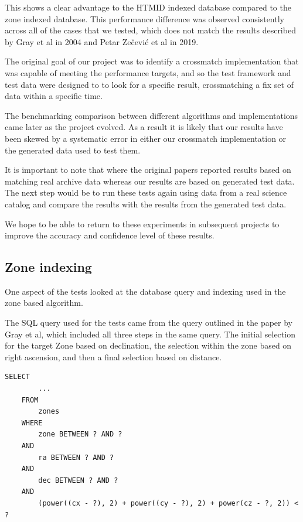 \documentclass{article}
\newcommand{\htmid} {HTMID\xspace}
\newcommand{\crossmatch} {crossmatch\xspace}
\newcommand{\crossmatching} {crossmatching\xspace}
\newcommand{\benchmarking} {benchmarking\xspace}
\begin{document}
This shows a clear advantage to the \htmid indexed database compared to the zone indexed database.
This performance difference was observed consistently across all of the cases that we tested, which does not match the results described by Gray et al in 2004\cite{Gray-2004} and Petar Zečević et al in 2019\cite{Zecevic-2019}.

The original goal of our project was to identify a \crossmatch
implementation that was capable of meeting the performance targets, and so the test framework and test data were designed to to look for a specific result, \crossmatching a fix set of data within a specific time.

The \benchmarking comparison between different algorithms and implementations came later as the project evolved. As a result it is likely that our results have been skewed by a systematic error in either our \crossmatch implementation or the generated data used to test them.

It is important to note that where the original papers reported results based on matching real archive data whereas our results are based on generated test data.
The next step would be to run these tests again using data from a real science catalog and compare the results with the results from the generated test data.

We hope to be able to return to these experiments in subsequent projects to improve the accuracy and confidence level of these results.

\subsection{Zone indexing}
\label{zone-indexing}

One aspect of the tests looked at the database query and indexing used in the zone based algorithm.

The SQL query used for the tests came from the query outlined in the paper by Gray et al, which included all three steps in the same query. The initial selection for the target Zone based on declination, the selection within the zone based on right ascension, and then a final selection based on distance.

\begin{lstlisting}[style=SQL]
    SELECT
        ...
    FROM
        zones
    WHERE
        zone BETWEEN ? AND ?
    AND
        ra BETWEEN ? AND ?
    AND
        dec BETWEEN ? AND ?
    AND
        (power((cx - ?), 2) + power((cy - ?), 2) + power(cz - ?, 2)) < ?
\end{lstlisting}
\end{document}
